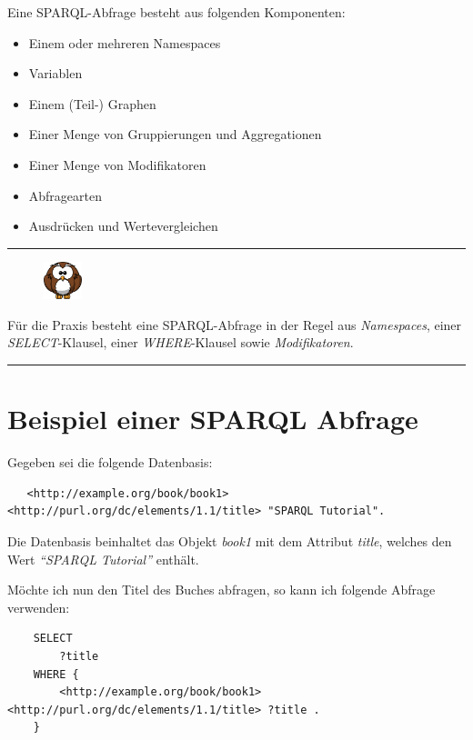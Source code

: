Eine SPARQL-Abfrage besteht aus folgenden Komponenten:
\begin{itemize}
    \item Einem oder mehreren Namespaces
    \item Variablen
    \item Einem (Teil-) Graphen
    \item Einer Menge von Gruppierungen und Aggregationen
    \item Einer Menge von Modifikatoren
    \item Abfragearten
    \item Ausdrücken und Wertevergleichen
\end{itemize}

\noindent\rule[1ex]{\textwidth}{1pt}
\begin{figure}
    \vspace{-19pt}
    \includegraphics[width=0.1\textwidth]{bilder/owl.png}
\end{figure}
Für die Praxis besteht eine SPARQL-Abfrage in der Regel aus \textit{Namespaces}, einer \textit{SELECT}-Klausel, einer \textit{WHERE}-Klausel sowie \textit{Modifikatoren}.\\

\noindent\rule[1ex]{\textwidth}{1pt}

\section{Beispiel einer SPARQL Abfrage}
\label{sec:sparql_beispiel}

Gegeben sei die folgende Datenbasis:
\begin{lstlisting}
   <http://example.org/book/book1> <http://purl.org/dc/elements/1.1/title> "SPARQL Tutorial".
\end{lstlisting}

Die Datenbasis beinhaltet das Objekt \textit{book1} mit dem Attribut \textit{title}, welches den Wert \textit{``SPARQL Tutorial''} enthält.

Möchte ich nun den Titel des Buches abfragen, so kann ich folgende Abfrage verwenden:
\begin{lstlisting}
    SELECT
        ?title
    WHERE {
        <http://example.org/book/book1> <http://purl.org/dc/elements/1.1/title> ?title .
    }
\end{lstlisting}


